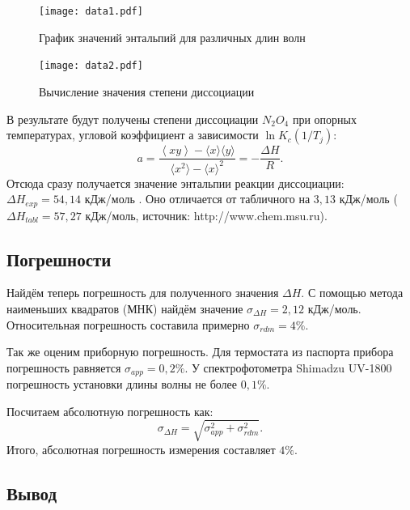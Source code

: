 \documentclass[a4paper,12pt]{article} %
\begin{document}
\begin{figure}[h!]
\begin{center}

\end{center}
	\texttt{[image: data1.pdf]}
	\caption{График значений энтальпий для 			различных длин волн} \label{dz1}
\end{figure}

\begin{figure}[h!]
\begin{center}

\end{center}
	\texttt{[image: data2.pdf]}
	\caption{Вычисление значения степени 			диссоциации} \label{dz2}
\end{figure}


В результате будут получены степени диссоциации $N_2O_4$ при опорных температурах, угловой коэффициент \(а\) зависимости $\ln K_c(1/T_j)$:
\begin{equation}
a = \frac{ \left\langle xy \right\rangle - \langle x \rangle \langle y \rangle}{\langle x^2 \rangle - \langle x \rangle ^2} = -\frac{\Delta H}{R}.
\end{equation}
Отсюда сразу получается значение энтальпии реакции диссоциации: $\Delta H_{exp} = 54,14 $ кДж/моль . Оно отличается от табличного на \( 3,13 \) кДж/моль (\(\Delta H_{tabl} = 57,27\) кДж/моль, источник: http://www.chem.msu.ru).

\subsection*{Погрешности}

Найдём теперь погрешность для полученного значения $\Delta H$.
С помощью метода наименьших квадратов (МНК) найдём значение $\sigma_{\Delta H} = 2,12$ кДж/моль. Относительная погрешность составила примерно $\sigma_{rdm} = 4 \%$.

Так же оценим приборную погрешность.
Для термостата из паспорта прибора погрешность равняется $\sigma_{app} = 0,2 \%$.
У спектрофотометра Shimadzu UV-1800 погрешность установки длины волны не более $0,1 \%$. 

Посчитаем абсолютную погрешность как:
\begin{equation}
\sigma_{\Delta H} = \sqrt{\sigma_{app}^2+\sigma_{rdm}^2}.
\end{equation}
Итого, абсолютная погрешность измерения составляет $4 \%$.

\subsection*{Вывод}
\end{document}
